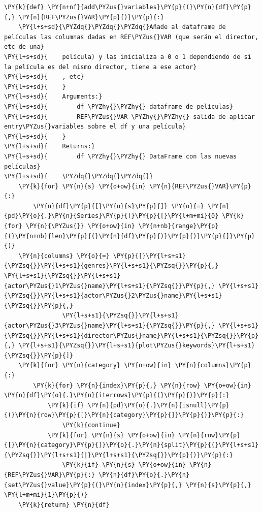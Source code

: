     \begin{tcolorbox}[breakable, size=fbox, boxrule=1pt, pad at break*=1mm,colback=cellbackground, colframe=cellborder]
\begin{Verbatim}[commandchars=\\\{\}]
\PY{k}{def} \PY{n+nf}{add\PYZus{}variables}\PY{p}{(}\PY{n}{df}\PY{p}{,} \PY{n}{REF\PYZus{}VAR}\PY{p}{)}\PY{p}{:}
    \PY{l+s+sd}{\PYZdq{}\PYZdq{}\PYZdq{}Añade al dataframe de películas las columnas dadas en REF\PYZus{}VAR (que serán el director, etc de una}
\PY{l+s+sd}{    película) y las inicializa a 0 o 1 dependiendo de si la película es del mismo director, tiene a ese actor}
\PY{l+s+sd}{    , etc}
\PY{l+s+sd}{    }
\PY{l+s+sd}{    Arguments:}
\PY{l+s+sd}{        df \PYZhy{}\PYZhy{} dataframe de películas}
\PY{l+s+sd}{        REF\PYZus{}VAR \PYZhy{}\PYZhy{} salida de aplicar entry\PYZus{}variables sobre el df y una película}
\PY{l+s+sd}{    }
\PY{l+s+sd}{    Returns:}
\PY{l+s+sd}{        df \PYZhy{}\PYZhy{} DataFrame con las nuevas películas}
\PY{l+s+sd}{    \PYZdq{}\PYZdq{}\PYZdq{}}
    \PY{k}{for} \PY{n}{s} \PY{o+ow}{in} \PY{n}{REF\PYZus{}VAR}\PY{p}{:} 
        \PY{n}{df}\PY{p}{[}\PY{n}{s}\PY{p}{]} \PY{o}{=} \PY{n}{pd}\PY{o}{.}\PY{n}{Series}\PY{p}{(}\PY{p}{[}\PY{l+m+mi}{0} \PY{k}{for} \PY{n}{\PYZus{}} \PY{o+ow}{in} \PY{n+nb}{range}\PY{p}{(}\PY{n+nb}{len}\PY{p}{(}\PY{n}{df}\PY{p}{)}\PY{p}{)}\PY{p}{]}\PY{p}{)}
    \PY{n}{columns} \PY{o}{=} \PY{p}{[}\PY{l+s+s1}{\PYZsq{}}\PY{l+s+s1}{genres}\PY{l+s+s1}{\PYZsq{}}\PY{p}{,} \PY{l+s+s1}{\PYZsq{}}\PY{l+s+s1}{actor\PYZus{}1\PYZus{}name}\PY{l+s+s1}{\PYZsq{}}\PY{p}{,} \PY{l+s+s1}{\PYZsq{}}\PY{l+s+s1}{actor\PYZus{}2\PYZus{}name}\PY{l+s+s1}{\PYZsq{}}\PY{p}{,}
                \PY{l+s+s1}{\PYZsq{}}\PY{l+s+s1}{actor\PYZus{}3\PYZus{}name}\PY{l+s+s1}{\PYZsq{}}\PY{p}{,} \PY{l+s+s1}{\PYZsq{}}\PY{l+s+s1}{director\PYZus{}name}\PY{l+s+s1}{\PYZsq{}}\PY{p}{,} \PY{l+s+s1}{\PYZsq{}}\PY{l+s+s1}{plot\PYZus{}keywords}\PY{l+s+s1}{\PYZsq{}}\PY{p}{]}
    \PY{k}{for} \PY{n}{category} \PY{o+ow}{in} \PY{n}{columns}\PY{p}{:}
        \PY{k}{for} \PY{n}{index}\PY{p}{,} \PY{n}{row} \PY{o+ow}{in} \PY{n}{df}\PY{o}{.}\PY{n}{iterrows}\PY{p}{(}\PY{p}{)}\PY{p}{:}
            \PY{k}{if} \PY{n}{pd}\PY{o}{.}\PY{n}{isnull}\PY{p}{(}\PY{n}{row}\PY{p}{[}\PY{n}{category}\PY{p}{]}\PY{p}{)}\PY{p}{:} 
                \PY{k}{continue}
            \PY{k}{for} \PY{n}{s} \PY{o+ow}{in} \PY{n}{row}\PY{p}{[}\PY{n}{category}\PY{p}{]}\PY{o}{.}\PY{n}{split}\PY{p}{(}\PY{l+s+s1}{\PYZsq{}}\PY{l+s+s1}{|}\PY{l+s+s1}{\PYZsq{}}\PY{p}{)}\PY{p}{:}
                \PY{k}{if} \PY{n}{s} \PY{o+ow}{in} \PY{n}{REF\PYZus{}VAR}\PY{p}{:} \PY{n}{df}\PY{o}{.}\PY{n}{set\PYZus{}value}\PY{p}{(}\PY{n}{index}\PY{p}{,} \PY{n}{s}\PY{p}{,} \PY{l+m+mi}{1}\PY{p}{)}            
    \PY{k}{return} \PY{n}{df}
\end{Verbatim}
\end{tcolorbox}


